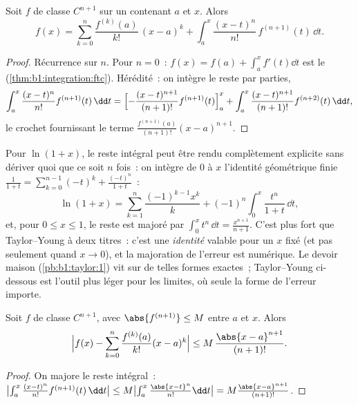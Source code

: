 \begin{theorem}\label{thm:b1:taylor:integral}
Soit $f$ de classe $C^{n+1}$ sur un  contenant $a$ et $x$.
Alors
\[
f(x) = \sum_{k=0}^{n} \frac{f^{(k)}(a)}{k!}\,(x - a)^k
+ \int_a^x \frac{(x - t)^n}{n!}\, f^{(n+1)}(t)\, \dd t .
\]
\end{theorem}

\begin{proof}
Récurrence sur $n$. Pour $n = 0$~: $f(x) = f(a) + \int_a^x f'(t)\dd t$
est le 
(\cref{thm:b1:integration:ftc}). Hérédité~: on intègre le reste par
parties,
\[
\int_a^x \frac{(x-t)^n}{n!} f^{(n+1)}(t)\,\dd t
= \Bigl[-\frac{(x-t)^{n+1}}{(n+1)!} f^{(n+1)}(t)\Bigr]_a^x
+ \int_a^x \frac{(x-t)^{n+1}}{(n+1)!} f^{(n+2)}(t)\,\dd t ,
\]
le crochet fournissant le terme $\frac{f^{(n+1)}(a)}{(n+1)!}(x -
a)^{n+1}$.
\end{proof}

\begin{example}\label{ex:b1:taylor:lnexact}
Pour $\ln(1 + x)$, le reste intégral peut être rendu complètement
explicite sans dériver quoi que ce soit $n$ fois~: on intègre de
$0$ à $x$ l'identité géométrique finie $\frac{1}{1+t} =
\sum_{k=0}^{n-1}(-t)^k + \frac{(-t)^n}{1+t}$~:
\[
\ln(1 + x) = \sum_{k=1}^{n} \frac{(-1)^{k-1}x^k}{k}
+ (-1)^n \int_0^x \frac{t^n}{1 + t}\,\dd t ,
\]
et, pour $0 \leq x \leq 1$, le reste est majoré par $\int_0^x
t^n\,\dd t = \frac{x^{n+1}}{n+1}$. C'est plus fort que
Taylor--Young à deux titres~: c'est une \emph{identité} valable pour
un $x$ fixé (et pas seulement quand $x \to 0$), et la majoration de
l'erreur est numérique. Le devoir maison (\cref{pb:b1:taylor:1}) vit
sur de telles formes exactes~; Taylor--Young ci-dessous est l'outil
plus léger pour les limites, où seule la forme de l'erreur importe.
\end{example}

\begin{theorem}\label{thm:b1:taylor:lagrange}
Soit $f$ de classe $C^{n+1}$, avec $\abs{f^{(n+1)}} \leq M$ entre $a$
et $x$. Alors
\[
\Bigl| f(x) - \sum_{k=0}^{n} \frac{f^{(k)}(a)}{k!}(x-a)^k \Bigr|
\leq M\, \frac{\abs{x - a}^{n+1}}{(n+1)!} .
\]
\end{theorem}

\begin{proof}
On majore le reste intégral~: $\bigl|\int_a^x \frac{(x-t)^n}{n!}
f^{(n+1)}(t)\,\dd t\bigr| \leq M \bigl|\int_a^x
\frac{\abs{x-t}^n}{n!}\dd t\bigr| = M\frac{\abs{x-a}^{n+1}}{(n+1)!}$.
\end{proof}

